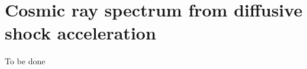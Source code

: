 \section{Cosmic ray spectrum from diffusive shock acceleration}

{\color{red}To be done}

%
%
%
%
%
